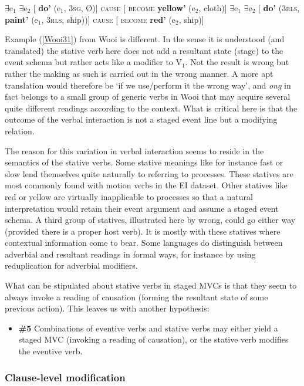 \ea
\ea \label{Kaera20_LS} $\exists$e$_1$ $\exists$e$_2$ [ \textbf{do'} (e$_1$, 3\textsc{sg}, Ø)] \textsc{cause} [ \textsc{become} \textbf{yellow'} (e$_2$, cloth)]
\ex \label{Tukang38_LS} $\exists$e$_1$ $\exists$e$_2$ [ \textbf{do'} (3\textsc{rls}, \textbf{paint'} (e$_1$, 3\textsc{rls}, ship))] \textsc{cause} [ \textsc{become} \textbf{red'} (e$_2$, ship)]
\z
\z


Example (\ref{Wooi31}) from Wooi is different. In the sense it is understood (and translated) the stative verb here does not add a resultant state (stage) to the event schema but rather acts like a modifier to V$_1$. Not the result is wrong but rather the making as such is carried out in the wrong manner. A more apt translation would therefore be `if we use/perform it the wrong way', and \textit{ong} in fact belongs to a small group of generic verbs in Wooi that may acquire several quite different readings according to the context. What is critical here is that the outcome of the verbal interaction is not a staged event line but a modifying relation. 

The reason for this variation in verbal interaction seems to reside in the semantics of the stative verbs. Some stative meanings like for instance fast or slow lend themselves quite naturally to referring to processes. These statives are most commonly found with motion verbs in the EI dataset. Other statives like red or yellow are virtually inapplicable to processes so that a natural interpretation would retain their event argument and assume a staged event schema. A third group of statives, illustrated here by wrong, could go either way (provided there is a proper host verb). It is mostly with these statives where contextual information come to bear. Some languages do distinguish between adverbial and resultant readings in formal ways, for instance by using reduplication for adverbial modifiers.

What can be stipulated about stative verbs in staged MVCs is that they seem to always invoke a reading of causation (forming the resultant state of some previous action). This leaves us with another hypothesis:

\begin{itemize}
\item \textbf{\#5} Combinations of eventive verbs and stative verbs may either yield a staged MVC (invoking a reading of causation), or the stative verb modifies the eventive verb.
\end{itemize}

\subsubsection{Clause-level modification}\label{sec:clauselevelmodification}


